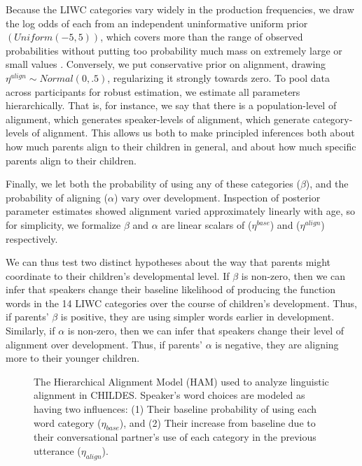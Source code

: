 \documentclass[10pt,letterpaper]{article}
\begin{document}
Because the LIWC categories vary widely in the production frequencies, we draw the log odds of each from an independent uninformative uniform prior $\left(Uniform\left(-5,5\right)\right)$, which covers more than the range of observed probabilities without putting too probability much mass on extremely large or small values \cite{gelman2008}. Conversely, we put conservative prior on alignment, drawing $\eta^{align} \sim Normal(0,.5)$, regularizing it strongly towards zero. To pool data across participants for robust estimation, we estimate all parameters hierarchically. That is, for instance, we say that there is a population-level of alignment, which generates speaker-levels of alignment, which generate category-levels of alignment. This allows us both to make principled inferences both about how much parents align to their children in general, and about how much specific parents align to their children.

Finally, we let both the probability of using any of these categories ($\beta$), and the probability of aligning ($\alpha$) vary over development. Inspection of posterior parameter estimates showed alignment varied approximately linearly with age, so for simplicity, we formalize $\beta$ and $\alpha$ are linear scalars of ($\eta^{base}$) and ($\eta^{align}$) respectively. 

We can thus test two distinct hypotheses about the way that parents might coordinate to their children's developmental level. If $\beta$ is non-zero, then we can infer that speakers change their baseline likelihood of producing the function words in the 14 LIWC categories over the course of children's development. Thus, if parents' $\beta$ is positive, they are using simpler words earlier in development. Similarly, if $\alpha$ is non-zero, then we can infer that speakers change their level of alignment over development. Thus, if parents' $\alpha$ is negative, they are aligning more to their younger children.


\begin{figure}[tb]
  \begin{center}
    
  \end{center}
  \caption{The Hierarchical Alignment Model (HAM) used to analyze linguistic alignment in CHILDES. Speaker's word choices are modeled as having two influences: (1) Their baseline probability of using each word category ($\eta_{base}$), and (2) Their increase from baseline due to their conversational partner's use of each category in the previous utterance ($\eta_{align}$).}
  \label{fig:model}
\end{figure}
\end{document}
